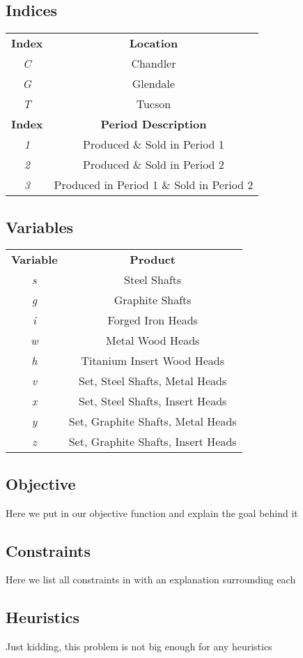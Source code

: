 \documentclass{article}
\begin{document}
\subsection{Indices}
\begin{tabular}{ c c }
\textbf{Index} & \textbf{Location} \\
\textit{C} & Chandler \\
\textit{G} & Glendale \\
\textit{T} & Tucson \\
\textbf{Index} & \textbf{Period Description} \\
\textit{1} & Produced \& Sold in Period 1 \\
\textit{2} & Produced \& Sold in Period 2 \\
\textit{3} & Produced in Period 1 \& Sold in Period 2 \\
\end{tabular}
\subsection{Variables}
\begin{tabular}{ c c }
\textbf{Variable} & \textbf{Product} \\
\textit{s} & Steel Shafts \\
\textit{g} & Graphite Shafts \\
\textit{i} & Forged Iron Heads \\
\textit{w} & Metal Wood Heads \\
\textit{h} & Titanium Insert Wood Heads \\
\textit{v} & Set, Steel Shafts, Metal Heads \\
\textit{x} & Set, Steel Shafts, Insert Heads \\
\textit{y} & Set, Graphite Shafts, Metal Heads \\
\textit{z} & Set, Graphite Shafts, Insert Heads \\
\end{tabular}
\subsection{Objective}
Here we put in our objective function and explain the goal behind it
\subsection{Constraints}
Here we list all constraints in with an explanation surrounding each
\subsection{Heuristics}
Just kidding, this problem is not big enough for any heuristics
\end{document}
